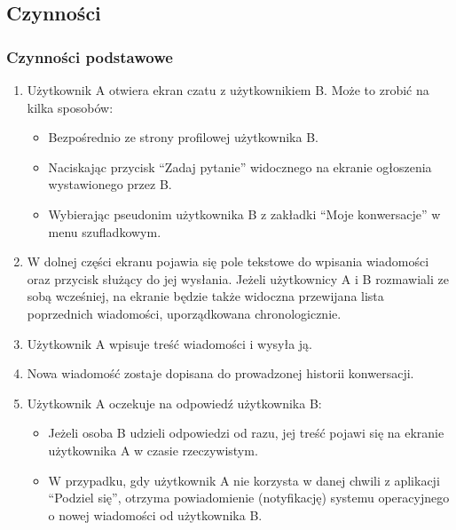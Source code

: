 \documentclass[12pt,a4paper,twoside]{article}
\begin{document}
    
    \subsection{Czynności}
    
    
    \subsubsection{Czynności podstawowe}
    
    
    \begin{enumerate}
        \item Użytkownik A otwiera ekran czatu z użytkownikiem B. Może to zrobić na kilka sposobów:
        \begin{itemize}
            \item Bezpośrednio ze strony profilowej użytkownika B.
            \item Naciskając przycisk ``Zadaj pytanie'' widocznego na ekranie ogłoszenia wystawionego przez B.
            \item Wybierając pseudonim użytkownika B z zakładki ``Moje konwersacje'' w menu szufladkowym.
        \end{itemize}
        \item W dolnej części ekranu pojawia się pole tekstowe do wpisania wiadomości oraz przycisk służący do jej wysłania. Jeżeli użytkownicy A i B rozmawiali ze sobą wcześniej, na ekranie będzie także widoczna przewijana lista poprzednich wiadomości, uporządkowana chronologicznie.
        \item Użytkownik A wpisuje treść wiadomości i wysyła ją.
        \item Nowa wiadomość zostaje dopisana do prowadzonej historii konwersacji.
        \item Użytkownik A oczekuje na odpowiedź użytkownika B:\@
        \begin{itemize}
            \item Jeżeli osoba B udzieli odpowiedzi od razu, jej treść pojawi się na ekranie użytkownika A w czasie rzeczywistym.
            \item W przypadku, gdy użytkownik A nie korzysta w danej chwili z aplikacji ``Podziel się'', otrzyma powiadomienie (notyfikację) systemu operacyjnego o nowej wiadomości od użytkownika B.
        \end{itemize}
    \end{enumerate}
    
    
\end{document}
